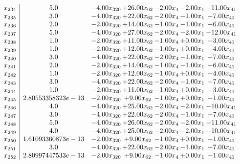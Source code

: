 \documentclass[8pt]{article}
\begin{document}
\[\begin{array}{c| c c@{\hskip 2pt} c@{\hskip 2pt} c@{\hskip 2pt} c@{\hskip 2pt} c@{\hskip 2pt} }
 x_{234}   &  5.0 & -4.00 x_{320} & + 26.00 x_{62} & -2.00 x_{4} & -2.00 x_{1} & -11.00 x_{41}\\
 x_{235}   &  3.0 & -4.00 x_{320} & + 22.00 x_{62} & -2.00 x_{4} & -1.00 x_{1} & -7.00 x_{41}\\
 x_{236}   &  2.0 & -2.00 x_{320} & + 14.00 x_{62} & -1.00 x_{4} & -1.00 x_{1} & -6.00 x_{41}\\
 x_{237}   &  5.0 & -4.00 x_{320} & + 27.00 x_{62} & -2.00 x_{4} & -2.00 x_{1} & -12.00 x_{41}\\
 x_{238}   &  1.0 & -2.00 x_{320} & + 11.00 x_{62} & -1.00 x_{4} & +  0.00 x_{1} & -3.00 x_{41}\\
 x_{239}   &  1.0 & -2.00 x_{320} & + 12.00 x_{62} & -1.00 x_{4} & +  0.00 x_{1} & -4.00 x_{41}\\
 x_{240}   &  3.0 & -4.00 x_{320} & + 22.00 x_{62} & -2.00 x_{4} & -1.00 x_{1} & -7.00 x_{41}\\
 x_{241}   &  2.0 & -2.00 x_{320} & + 14.00 x_{62} & -1.00 x_{4} & -1.00 x_{1} & -6.00 x_{41}\\
 x_{242}   &  1.0 & -2.00 x_{320} & + 12.00 x_{62} & -1.00 x_{4} & +  0.00 x_{1} & -4.00 x_{41}\\
 x_{243}   &  3.0 & -4.00 x_{320} & + 22.00 x_{62} & -2.00 x_{4} & -1.00 x_{1} & -7.00 x_{41}\\
 x_{244}   &  1.0 & -2.00 x_{320} & + 11.00 x_{62} & -1.00 x_{4} & +  0.00 x_{1} & -3.00 x_{41}\\
 x_{245}   &  2.80553358323e-13 & -2.00 x_{320} & +  9.00 x_{62} & -1.00 x_{4} & +  0.00 x_{1} & -1.00 x_{41}\\
 x_{246}   &  4.0 & -4.00 x_{320} & + 25.00 x_{62} & -2.00 x_{4} & -2.00 x_{1} & -10.00 x_{41}\\
 x_{247}   &  3.0 & -4.00 x_{320} & + 22.00 x_{62} & -2.00 x_{4} & -1.00 x_{1} & -7.00 x_{41}\\
 x_{248}   &  5.0 & -4.00 x_{320} & + 26.00 x_{62} & -2.00 x_{4} & -2.00 x_{1} & -11.00 x_{41}\\
 x_{249}   &  4.0 & -4.00 x_{320} & + 25.00 x_{62} & -2.00 x_{4} & -2.00 x_{1} & -10.00 x_{41}\\
 x_{250}   &  1.61093360873e-13 & -2.00 x_{320} & +  9.00 x_{62} & -1.00 x_{4} & +  0.00 x_{1} & -1.00 x_{41}\\
 x_{251}   &  3.0 & -4.00 x_{320} & + 22.00 x_{62} & -2.00 x_{4} & -1.00 x_{1} & -7.00 x_{41}\\
 x_{252}   &  2.80997447533e-13 & -2.00 x_{320} & +  9.00 x_{62} & -1.00 x_{4} & +  0.00 x_{1} & -1.00 x_{41}\\

\end{array}\]
\end{document}
